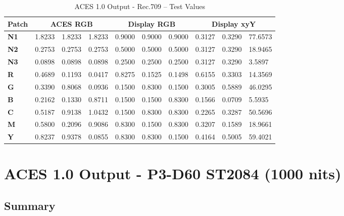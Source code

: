 \begin{table}[ht!]
    \centering
    \begin{tabular}{|l|l|l|l|l|l|l|l|l|l|}
        \hline
        \multicolumn{1}{|c|}{\textbf{Patch}} & \multicolumn{3}{c|}{\textbf{ACES RGB}} & \multicolumn{3}{c|}{\textbf{Display RGB}} & \multicolumn{3}{c|}{\textbf{Display xyY}} \\ \hline
        \textbf{N1} & 1.8233 & 1.8233 & 1.8233 & 0.9000 & 0.9000 & 0.9000 & 0.3127 & 0.3290 & 77.6573 \\ \hline
        \textbf{N2} & 0.2753 & 0.2753 & 0.2753 & 0.5000 & 0.5000 & 0.5000 & 0.3127 & 0.3290 & 18.9465 \\ \hline
        \textbf{N3} & 0.0898 & 0.0898 & 0.0898 & 0.2500 & 0.2500 & 0.2500 & 0.3127 & 0.3290 & 3.5897  \\ \hline
        \textbf{R}  & 0.4689 & 0.1193 & 0.0417 & 0.8275 & 0.1525 & 0.1498 & 0.6155 & 0.3303 & 14.3569 \\ \hline
        \textbf{G}  & 0.3390 & 0.8068 & 0.0936 & 0.1500 & 0.8300 & 0.1500 & 0.3005 & 0.5889 & 46.0295 \\ \hline
        \textbf{B}  & 0.2162 & 0.1330 & 0.8711 & 0.1500 & 0.1500 & 0.8300 & 0.1566 & 0.0709 & 5.5935  \\ \hline
        \textbf{C}  & 0.5187 & 0.9138 & 1.0432 & 0.1500 & 0.8300 & 0.8300 & 0.2265 & 0.3287 & 50.5696 \\ \hline
        \textbf{M}  & 0.5800 & 0.2096 & 0.9086 & 0.8300 & 0.1500 & 0.8300 & 0.3207 & 0.1589 & 18.9661 \\ \hline
        \textbf{Y}  & 0.8237 & 0.9378 & 0.0855 & 0.8300 & 0.8300 & 0.1500 & 0.4164 & 0.5005 & 59.4021 \\ \hline
    \end{tabular}
    \caption[ACES 1.0 Output - Rec.709 -- Test Values]{\small ACES 1.0 Output - Rec.709 -- Test Values}
    \label{tab:testValues-rec709}
\end{table}



\clearpage
\section{ACES 1.0 Output - P3-D60 ST2084 (1000 nits)}
\label{sec:odt-details-p3d60_1000nit}

\subsection{Summary}
\label{subsec:summary-p3d60_1000nit}

